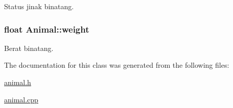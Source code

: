 Status jinak binatang. 

\subsubsection[{\texorpdfstring{weight}{weight}}]{\setlength{\rightskip}{0pt plus 5cm}float Animal\+::weight\hspace{0.3cm}{\ttfamily [protected]}}\hypertarget{classAnimal_a055c4df7dacb89eb4c2ca9bbee11ff24}{}\label{classAnimal_a055c4df7dacb89eb4c2ca9bbee11ff24}


Berat binatang. 



The documentation for this class was generated from the following files\+:\begin{DoxyCompactItemize}
\item 
\hyperlink{animal_8h}{animal.\+h}\item 
\hyperlink{animal_8cpp}{animal.\+cpp}\end{DoxyCompactItemize}

